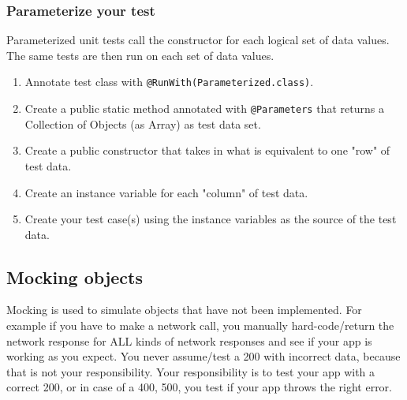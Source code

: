 \documentclass{article}
\begin{document}
\subsubsection{Parameterize your test}
Parameterized unit tests call the constructor for each logical set of data values. The same tests are then run on each set of data values.
\begin{enumerate}
    \item Annotate test class with \lstinline{@RunWith(Parameterized.class)}.
    \item Create a public static method annotated with \lstinline{@Parameters} that returns a Collection of Objects (as Array) as test data set.
    \item Create a public constructor that takes in what is equivalent to one "row" of test data.
    \item Create an instance variable for each "column" of test data.
    \item Create your test case(s) using the instance variables as the source of the test data.
\end{enumerate}

\break

\subsection{Mocking objects}
Mocking is used to simulate objects that have not been implemented. For example if you have to make a network call, you manually hard-code/return the network response for ALL kinds of network responses and see if your app is working as you expect. You never assume/test a 200 with incorrect data, because that is not your responsibility. Your responsibility is to test your app with a correct 200, or in case of a 400, 500, you test if your app throws the right error.
\end{document}
